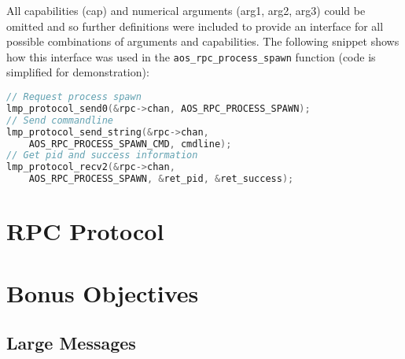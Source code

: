 All capabilities (cap) and numerical arguments (arg1, arg2, arg3) could be omitted and so further definitions were included to provide an interface for all possible combinations of arguments and capabilities. The following snippet shows how this interface was used in the \verb|aos_rpc_process_spawn| function (code is simplified for demonstration):

\begin{lstlisting}[language=c, caption=Usage of aos/lmp\_protocol in aos\_rpc\_process\_spawn]
// Request process spawn
lmp_protocol_send0(&rpc->chan, AOS_RPC_PROCESS_SPAWN);
// Send commandline
lmp_protocol_send_string(&rpc->chan,
    AOS_RPC_PROCESS_SPAWN_CMD, cmdline);
// Get pid and success information
lmp_protocol_recv2(&rpc->chan,
    AOS_RPC_PROCESS_SPAWN, &ret_pid, &ret_success);
\end{lstlisting}

\section{RPC Protocol}

\section{Bonus Objectives}

\subsection{Large Messages}
